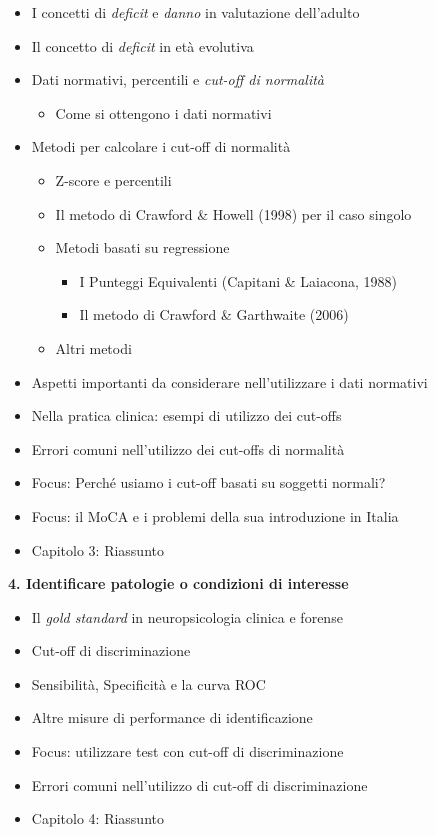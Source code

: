 \documentclass[
  italian,
  letterpaper,
  paper=A4,
  headinclude=on,
  footinclude=on,
  12pt]{scrbook}
\providecommand{\tightlist}{%
  \setlength{\itemsep}{0pt}\setlength{\parskip}{0pt}}
\begin{document}
\begin{itemize}
\tightlist
\item
  I concetti di \emph{deficit} e \emph{danno} in valutazione dell'adulto
\item
  Il concetto di \emph{deficit} in età evolutiva
\item
  Dati normativi, percentili e \emph{cut-off di normalità}

  \begin{itemize}
  \tightlist
  \item
    Come si ottengono i dati normativi
  \end{itemize}
\item
  Metodi per calcolare i cut-off di normalità

  \begin{itemize}
  \tightlist
  \item
    Z-score e percentili
  \item
    Il metodo di Crawford \& Howell (1998) per il caso singolo
  \item
    Metodi basati su regressione

    \begin{itemize}
    \tightlist
    \item
      I Punteggi Equivalenti (Capitani \& Laiacona, 1988)
    \item
      Il metodo di Crawford \& Garthwaite (2006)
    \end{itemize}
  \item
    Altri metodi
  \end{itemize}
\item
  Aspetti importanti da considerare nell'utilizzare i dati normativi
\item
  Nella pratica clinica: esempi di utilizzo dei cut-offs
\item
  Errori comuni nell'utilizzo dei cut-offs di normalità
\item
  Focus: Perché usiamo i cut-off basati su soggetti normali?
\item
  Focus: il MoCA e i problemi della sua introduzione in Italia
\item
  Capitolo 3: Riassunto
\end{itemize}

\textbf{4. Identificare patologie o condizioni di interesse}

\begin{itemize}
\tightlist
\item
  Il \emph{gold standard} in neuropsicologia clinica e forense
\item
  Cut-off di discriminazione
\item
  Sensibilità, Specificità e la curva ROC
\item
  Altre misure di performance di identificazione
\item
  Focus: utilizzare test con cut-off di discriminazione
\item
  Errori comuni nell'utilizzo di cut-off di discriminazione
\item
  Capitolo 4: Riassunto
\end{itemize}
\end{document}
